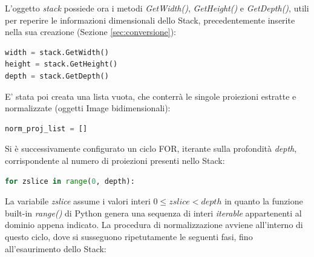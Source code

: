 \documentclass[a4paper,12pt, doubleside]{report}
\begin{document}
                L'oggetto \textit{stack} possiede ora i metodi \textit{GetWidth()}, \textit{GetHeight()} e \textit{GetDepth()}, utili per reperire le informazioni dimensionali dello Stack, precedentemente inserite nella sua creazione (Sezione \ref{sec:conversione}):
                \begin{lstlisting}[language=python, frame=bt]
width = stack.GetWidth()
height = stack.GetHeight()
depth = stack.GetDepth()
                \end{lstlisting} 
                
                E' stata poi creata una lista vuota, che conterrà le singole proiezioni estratte e normalizzate (oggetti Image bidimensionali):
                \begin{lstlisting}[language=python, frame=bt]
norm_proj_list = []
                \end{lstlisting}
                
                Si è successivamente configurato un ciclo FOR, iterante sulla profondità \textit{depth}, corrispondente al numero di proiezioni presenti nello Stack:
                \begin{lstlisting}[language=python, frame=bt]
for zslice in range(0, depth):
                \end{lstlisting} 

                La variabile \textit{zslice} assume i valori interi $0 \leq zslice < depth$ in quanto la funzione built-in \textit{range()} \cite{python-range} di Python genera una sequenza di interi \textit{iterable} \cite{python-iterable} appartenenti al dominio appena indicato. La procedura di normalizzazione avviene all'interno di questo ciclo, dove si susseguono ripetutamente le seguenti fasi, fino all'esaurimento dello Stack:
                
\end{document}
